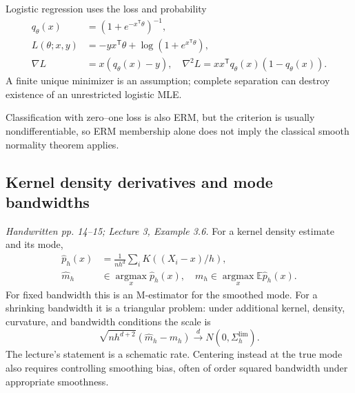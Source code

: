 \documentclass[12pt]{article}
\newcommand{\E}{\mathbb E}
\begin{document}
Logistic regression uses the loss and probability
\begin{align}
 q_\theta(x)&=(1+e^{-x^{\mathsf T}\theta})^{-1},\\
 L(\theta;x,y)&=-yx^{\mathsf T}\theta+\log(1+e^{x^{\mathsf T}\theta}),\\
 \nabla L&=x(q_\theta(x)-y),\quad
 \nabla^2 L=xx^{\mathsf T}q_\theta(x)(1-q_\theta(x)).
\end{align}
A finite unique minimizer is an assumption; complete separation can destroy
existence of an unrestricted logistic MLE.

Classification with zero--one loss is also ERM, but the criterion is usually
nondifferentiable, so ERM membership alone does not imply the classical
smooth normality theorem applies.

\subsection{Kernel density derivatives and mode bandwidths}
\textit{Handwritten pp. 14--15; Lecture 3, Example 3.6.}
For a kernel density estimate and its mode,
\begin{align}
 \widehat p_h(x)&=\frac1{nh^d}\sum_iK((X_i-x)/h),\\
 \widehat m_h&\in\operatorname*{argmax}_x\widehat p_h(x),\quad
 m_h\in\operatorname*{argmax}_x\E\widehat p_h(x).
\end{align}
For fixed bandwidth this is an M-estimator for the smoothed mode. For a
shrinking bandwidth it is a triangular problem: under additional kernel,
density, curvature, and bandwidth conditions the scale is
\begin{equation}
 \sqrt{nh^{d+2}}(\widehat m_h-m_h)\xrightarrow{d}N(0,\Sigma_h^{\mathrm{lim}}).
\end{equation}
The lecture's statement is a schematic rate. Centering instead at the true
mode also requires controlling smoothing bias, often of order squared
bandwidth under appropriate smoothness.
\end{document}
